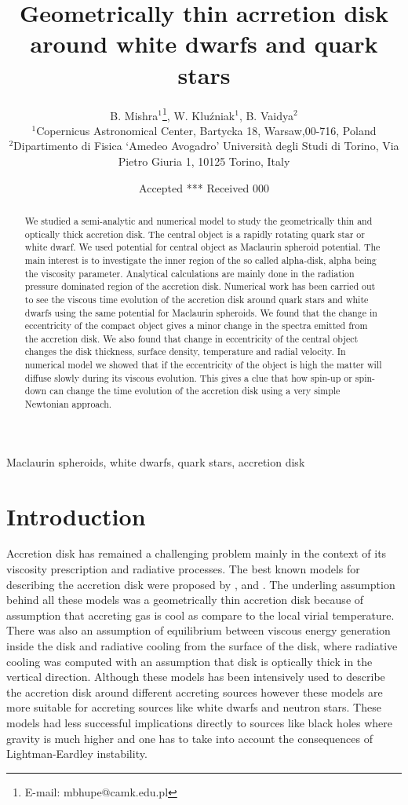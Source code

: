 \documentclass[useAMS,usenatbib]{mn2e}
\title[Geometrically thin acrretion disk around white dwarfs and quark stars]{Geometrically thin acrretion disk around white dwarfs and quark stars}
\author[B. Mishra, W. Klu\'zniak and B. Vaidya]{B. Mishra$^{1}$\thanks{E-mail:
mbhupe@camk.edu.pl}, W. Klu\'zniak$^{1}$, B. Vaidya$^{2}$\\
$^{1}$Copernicus Astronomical Center, Bartycka 18, Warsaw,00-716, Poland\\
$^{2}$Dipartimento di Fisica `Amedeo Avogadro' Università degli Studi di Torino, Via Pietro Giuria 1, 10125 Torino, Italy}
\begin{document}
\date{Accepted *** Received 000}
\pagerange{\pageref{firstpage}--\pageref{lastpage}} 
\maketitle
\label{firstpage}
\begin{abstract}
We studied a semi-analytic and numerical model to study the geometrically thin and optically thick accretion disk. The central object is a rapidly rotating quark star or white dwarf. We used potential for central object as Maclaurin spheroid potential. The main interest is to investigate the inner region of the so called alpha-disk, alpha being the viscosity parameter. Analytical calculations are mainly done in the radiation pressure dominated region of the accretion disk. Numerical work has been carried out to see the viscous time evolution of the accretion disk around quark stars and white dwarfs using the same potential for Maclaurin spheroids. We found that the change in eccentricity of the compact object gives a minor change in the spectra emitted from the accretion disk. We also found that change in eccentricity of the central object changes the disk thickness, surface density, temperature and radial velocity. In numerical model we showed that if the eccentricity of the object is high the matter will diffuse slowly during its viscous evolution. This gives a clue that how spin-up or spin-down can change the time evolution of the accretion disk using a very simple Newtonian approach.  
\end{abstract}
\begin{keywords}
Maclaurin spheroids, white dwarfs, quark stars, accretion disk
\end{keywords}
\section{Introduction}
Accretion disk has remained a challenging problem mainly in the context of its viscosity prescription and radiative processes. The best known models for describing the accretion disk were proposed by \citet{1973A&A....24..337S}, \citet{1973blho.conf..343N} and \citet{1974MNRAS.168..603L}. The underling assumption behind all these models was a geometrically thin accretion disk because of assumption that accreting gas is cool as compare to the local virial temperature. There was also an assumption of equilibrium between viscous energy generation inside the disk and radiative cooling from the surface of the disk, where radiative cooling was computed with an assumption that disk is optically thick in the vertical direction. Although these models has been intensively used to describe the accretion disk around different accreting sources however these models are more suitable for accreting sources like white dwarfs and neutron stars. These models had less successful implications directly to sources like black holes where gravity is much higher and one has to take into account the consequences of Lightman-Eardley instability. 
\end{document}
